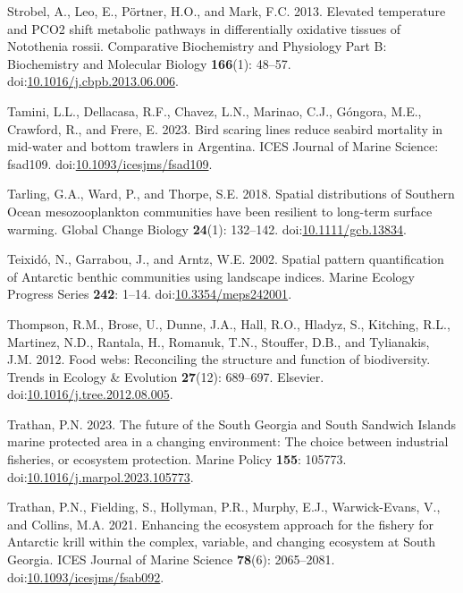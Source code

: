 \documentclass[
]{article}
\newlength{\cslhangindent}
\newenvironment{CSLReferences}[2] %
 {\begin{list}{}{%
  \setlength{\itemindent}{0pt}
  \setlength{\leftmargin}{0pt}
  \setlength{\parsep}{0pt}
  \ifodd #1
   \setlength{\leftmargin}{\cslhangindent}
   \setlength{\itemindent}{-1\cslhangindent}
  \fi
  \setlength{\itemsep}{#2\baselineskip}}}
 {\end{list}}
\begin{document}
\begin{CSLReferences}{1}{0}
Strobel, A., Leo, E., Pörtner, H.O., and Mark, F.C. 2013. Elevated
temperature and {PCO2} shift metabolic pathways in differentially
oxidative tissues of {Notothenia} rossii. Comparative Biochemistry and
Physiology Part B: Biochemistry and Molecular Biology \textbf{166}(1):
48--57.
doi:\href{https://doi.org/10.1016/j.cbpb.2013.06.006}{10.1016/j.cbpb.2013.06.006}.

Tamini, L.L., Dellacasa, R.F., Chavez, L.N., Marinao, C.J., Góngora,
M.E., Crawford, R., and Frere, E. 2023. Bird scaring lines reduce
seabird mortality in mid-water and bottom trawlers in {Argentina}. ICES
Journal of Marine Science: fsad109.
doi:\href{https://doi.org/10.1093/icesjms/fsad109}{10.1093/icesjms/fsad109}.

Tarling, G.A., Ward, P., and Thorpe, S.E. 2018. Spatial distributions of
{Southern Ocean} mesozooplankton communities have been resilient to
long-term surface warming. Global Change Biology \textbf{24}(1):
132--142.
doi:\href{https://doi.org/10.1111/gcb.13834}{10.1111/gcb.13834}.

Teixidó, N., Garrabou, J., and Arntz, W.E. 2002. Spatial pattern
quantification of {Antarctic} benthic communities using landscape
indices. Marine Ecology Progress Series \textbf{242}: 1--14.
doi:\href{https://doi.org/10.3354/meps242001}{10.3354/meps242001}.

Thompson, R.M., Brose, U., Dunne, J.A., Hall, R.O., Hladyz, S.,
Kitching, R.L., Martinez, N.D., Rantala, H., Romanuk, T.N., Stouffer,
D.B., and Tylianakis, J.M. 2012. Food webs: Reconciling the structure
and function of biodiversity. Trends in Ecology \& Evolution
\textbf{27}(12): 689--697. Elsevier.
doi:\href{https://doi.org/10.1016/j.tree.2012.08.005}{10.1016/j.tree.2012.08.005}.

Trathan, P.N. 2023. The future of the {South Georgia} and {South
Sandwich Islands} marine protected area in a changing environment: {The}
choice between industrial fisheries, or ecosystem protection. Marine
Policy \textbf{155}: 105773.
doi:\href{https://doi.org/10.1016/j.marpol.2023.105773}{10.1016/j.marpol.2023.105773}.

Trathan, P.N., Fielding, S., Hollyman, P.R., Murphy, E.J.,
Warwick-Evans, V., and Collins, M.A. 2021. Enhancing the ecosystem
approach for the fishery for {Antarctic} krill within the complex,
variable, and changing ecosystem at {South Georgia}. ICES Journal of
Marine Science \textbf{78}(6): 2065--2081.
doi:\href{https://doi.org/10.1093/icesjms/fsab092}{10.1093/icesjms/fsab092}.


\end{CSLReferences}
\end{document}
